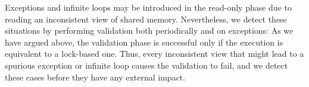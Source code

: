 Exceptions and infinite loops may be introduced in the read-only phase due to reading an inconsistent view of shared memory.
Nevertheless, we detect these situations by performing validation both periodically and on exceptions: As we have argued above,
the validation phase is successful only if the execution is equivalent to a lock-based one. Thus, every inconsistent
view that might lead to a spurious exception or infinite loop causes the validation to fail, and we  
detect these cases before they have any external impact. 